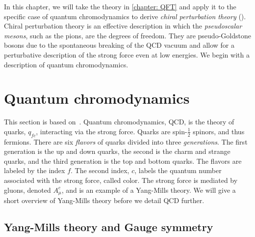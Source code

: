 In this chapter, we will take the theory in \autoref{chapter: QFT} and apply it to the specific case of quantum chromodynamics to derive \emph{chiral perturbation theory} (\chpt).
Chiral perturbation theory is an effective description in which the \emph{pseudoscalar mesons}, such as the pions, are the degrees of freedom.
They are pseudo-Goldstone bosons due to the spontaneous breaking of the QCD vacuum and allow for a perturbative description of the strong force even at low energies.
We begin with a description of quantum chromodynamics.


\section{Quantum chromodynamics}
\label{section:qcd}

This section is based on~\autocite{peskinIntroductionQuantumField1995,schererIntroductionChiralPerturbation2002,schwartzQuantumFieldTheory2013}.
Quantum chromodynamics, QCD, is the theory of quarks, $q_{fc}$, interacting via the strong force.
Quarks are spin-$\frac{1}{2}$ spinors, and thus fermions.
There are six \emph{flavors} of quarks divided into three \emph{generations}.
The first generation is the up and down quarks, the second is the charm and strange quarks, and the third generation is the top and bottom quarks.
The flavors are labeled by the index $f$.
The second index, $c$, labels the quantum number associated with the strong force, called color.
The strong force is mediated by gluons, denoted $A_\mu^c$, and is an example of a Yang-Mills theory.
We will give a short overview of Yang-Mills theory before we detail QCD further.


\subsection{Yang-Mills theory and Gauge symmetry}
\label{subsection: yang-mills theory and gauge symmetry}


